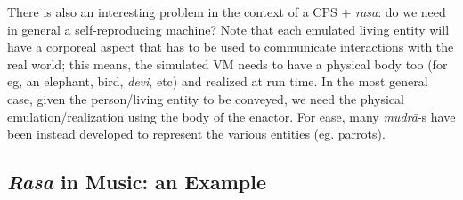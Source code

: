 There is also an interesting problem in the context of a CPS + \textsl{rasa}: do we need in general a self-reproducing machine? Note that each emulated living entity will have a corporeal aspect that has to be used to communicate interactions with the real world; this means, the simulated VM needs to have a physical body too (for eg, an elephant, bird, \textsl{devi}, etc) and realized at run time. In the most general case, given the person/living entity to be conveyed, we need the physical emulation/realization using the body of the enactor. For ease, many \textsl{mudrā}-s have been instead developed to represent the various entities (eg. parrots).\\[-20pt]

\subsection{\textsl{Rasa} in Music: an Example}\label{chap3-sec4.3}

